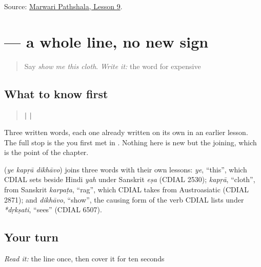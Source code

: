 \begin{tcolorbox}[breakable,colback=teal!4,colframe=teal!35!black,title={Before you move on}]
Source: \href{https://www.marwaripathshala.com/marwari-lesson-9-english}{Marwari Pathshala, Lesson 9}.
\end{tcolorbox}
\section[\texorpdfstring{\mw{ये} \mw{कपड़ा} \mw{दिखावो।} (ye kapṛā dikhāvo.)}{ये कपड़ा दिखावो। (ye kapṛā dikhāvo.)}]{   — a whole line, no new sign}

\label{lesson:MW-C21-show-request}



\begin{quote}
Say \emph{show me this cloth}. \emph{Write it:} the word for expensive
\end{quote}

\subsection*{What to know first}
\begin{quote}
\textbf{ |  | }
\end{quote}

Three written words, each one already written on its own in an earlier lesson. The full stop is the \textbf{} you first met in \textbf{ }. Nothing here is new but the joining, which is the point of the chapter.

\begin{cousinweb}
\textbf{  } (\emph{ye kapṛā dikhāvo}) joins three words with their own lessons: \emph{ye}, \textquotedblleft{}this\textquotedblright{}, which CDIAL sets beside Hindi \emph{yah} under Sanskrit \emph{eṣa} (CDIAL 2530); \emph{kapṛā}, \textquotedblleft{}cloth\textquotedblright{}, from Sanskrit \emph{karpaṭa}, \textquotedblleft{}rag\textquotedblright{}, which CDIAL takes from Austroasiatic (CDIAL 2871); and \emph{dikhāvo}, \textquotedblleft{}show\textquotedblright{}, the causing form of the verb CDIAL lists under \emph{*dṛkṣati}, \textquotedblleft{}sees\textquotedblright{} (CDIAL 6507).
\end{cousinweb}

\subsection*{Your turn}
\emph{Read it:} the line once, then cover it for ten seconds

